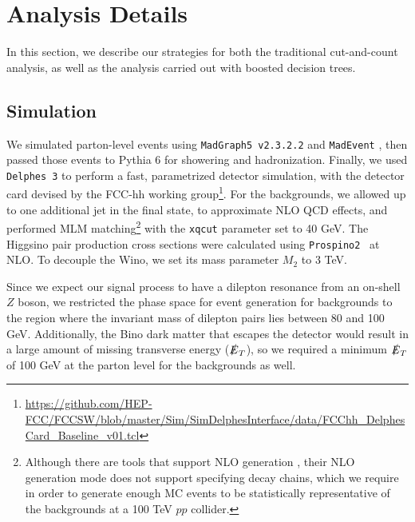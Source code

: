 \documentclass[a4paper,11pt]{article}
\newcommand{\met}{{\slashed{E}_T}}
\begin{document}
 

\section{Analysis Details}\label{sec:analysis}

In this section, we  describe our strategies for both the traditional
cut-and-count analysis, as well as the analysis carried out with boosted
decision trees. 

\subsection{Simulation}\label{simulation}

We simulated parton-level events using \texttt{MadGraph5 v2.3.2.2} and
\texttt{MadEvent} \cite{Alwall:2014hca}, then passed those events to Pythia 6
\cite{Sjostrand:2006za} for showering and hadronization. Finally, we used
\texttt{Delphes 3} \cite{deFavereau:2013fsa} to perform a fast, parametrized
detector simulation, with the detector card devised by the FCC-hh working
group\footnote{\url{https://github.com/HEP-FCC/FCCSW/blob/master/Sim/SimDelphesInterface/data/FCChh_DelphesCard_Baseline_v01.tcl}}.
For the backgrounds, we allowed up to one additional jet in the final state, to
approximate NLO QCD effects, and performed MLM matching\footnote{Although
there are tools that support NLO generation \cite{Alwall:2014hca}, their NLO
generation mode does not support specifying decay chains, which we require in
order to generate enough MC events to be statistically representative of the
backgrounds at a 100 TeV $pp$ collider.} with the \texttt{xqcut}
parameter set to 40 GeV. The Higgsino pair production cross sections were
calculated using \texttt{Prospino2}~\cite{Beenakker:1999xh} at NLO.  
To decouple the Wino, we set its mass parameter $M_2$ to 3 TeV.  

Since we expect our signal process to have a dilepton resonance from an on-shell
$Z$ boson, we restricted the phase space for event generation for backgrounds to
the region where the invariant mass of dilepton pairs lies between 80 and 100
GeV. Additionally, the Bino dark matter that escapes the detector would result
in a large amount of missing transverse energy ($\met$), so we required
a minimum $\met$ of 100 GeV at the parton level for the backgrounds as
well.  
\end{document}
